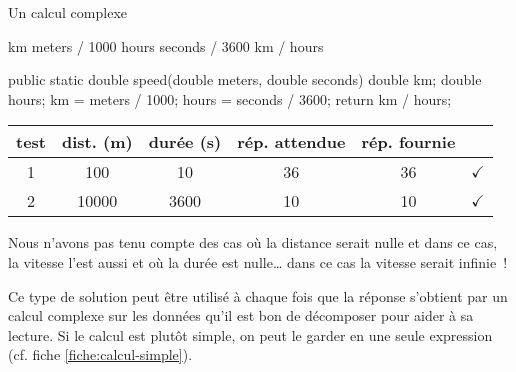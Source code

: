 \begin{Fiche}{Un calcul complexe}
	\begin{pseudocode}
			\Let km \Gets meters / 1000
			\Let hours \Gets seconds / 3600
			\Return km / hours
		\EndAlgo
	\end{pseudocode}

	\begin{java}
public static double speed(double meters, double seconds){
	double km;
	double hours;
	km = meters / 1000;
	hours = seconds / 3600;
	return km / hours;
}
	\end{java}


	\begin{center}
		\begin{tabular}{|c|cccc|c|}
		\hline
			\rowcolor{black!40}
		test \no & dist. (m) & durée (s) & rép. attendue 
			& rép. fournie & {} \\
		\hline 
		1 & 100   & 10   & 36 & 36 & {\color{ForestGreen}$\checkmark$} \\\hline
		2 & 10000 & 3600 & 10 & 10 & {\color{ForestGreen}$\checkmark$} \\\hline
		\end{tabular}
	\end{center}								


Nous n'avons pas tenu compte des cas où la distance serait nulle et dans ce
cas, la vitesse l'est aussi et où la durée est nulle… dans ce cas la vitesse
serait infinie~!



	Ce type de solution peut être utilisé à chaque fois que la réponse s’obtient
	par un calcul complexe sur les données qu’il est bon de décomposer pour
	aider à sa lecture.  Si le calcul est plutôt simple, on peut le garder en
	une seule expression (cf. fiche \vref{fiche:calcul-simple}).
	
\end{Fiche}
